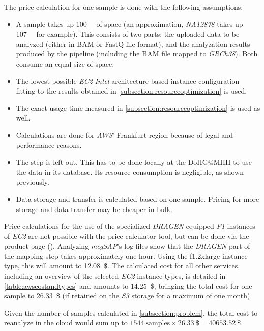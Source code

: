 The price calculation for one sample is done with the following assumptions:
\begin{itemize}
    \item A sample takes up \SI{100}{\giga\byte} of space (an approximation, \textit{NA12878} takes up \SI{107}{\giga\byte} for example). This consists of two parts: the uploaded data to be analyzed (either in BAM or FastQ file format), and the analyzation results produced by the pipeline (including the BAM file mapped to \textit{GRCh38}). Both consume an equal size of space.
    \item The lowest possible \textit{\ac{EC2}} \textit{Intel} architecture-based instance configuration fitting to the results obtained in \cref{subsection:resourceoptimization} is used.
    \item The exact usage time measured in \cref{subsection:resourceoptimization} is used as well.
    \item Calculations are done for \textit{\ac{AWS}}' Frankfurt region because of legal and performance reasons.
    \item The step  is left out. This has to be done locally at the \ac{DoHG@MHH} to use the data in its database. Its resource consumption is negligible, as shown previously.
    \item Data storage and transfer is calculated based on one sample. Pricing for more storage and data transfer may be cheaper in bulk.
\end{itemize}

Price calculations for the use of the specialized \textit{DRAGEN} equipped \textit{F1} instances of \textit{\ac{EC2}} are not possible with the price calculator tool, but can be done via the product page (\autocite{AmazonWebServices2023a}). Analyzing \textit{\ac{megSAP}}'s log files show that the \textit{DRAGEN} part of the mapping step takes approximately one hour. Using the f1.2xlarge instance type, this will amount to \SI{12.08}{\$}. The calculated cost for all other services, including an overview of the selected \textit{EC2} instance types, is detailed in \cref{table:awscostandtypes} and amounts to \SI{14.25}{\$}, bringing the total cost for one sample to \SI{26.33}{\$} (if retained on the \textit{S3} storage for a maximum of one month).

Given the number of samples calculated in \cref{subsection:problem}, the total cost to reanalyze in the cloud would sum up to $\SI{1544}{\text{samples}}\times\SI{26.33}{\$}=\SI{40653.52}{\$}$.

